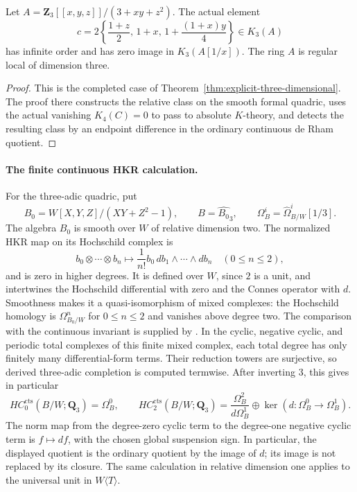 \begin{proposition}
\label{d3:prop:directtcoriginal}
Let $A=\mathbf Z_3[[x,y,z]]/(3+xy+z^2)$. The actual element
\[
 c=2\left\{\frac{1+z}{2},\,1+x,\,
                        1+\frac{(1+x)y}{4}\right\}\in K_3(A)
\]
has infinite order and has zero image in $K_3(A[1/x])$.
The ring $A$ is regular local of dimension three.
\end{proposition}
\begin{proof}
This is the completed case of Theorem~\ref{thm:explicit-three-dimensional}.
The proof there constructs the relative class on the smooth formal quadric,
uses the actual vanishing $K_4(C)=0$ to pass to absolute $K$-theory,
and detects the resulting class by an endpoint difference in the ordinary
continuous de Rham quotient.
\end{proof}

\paragraph{The finite continuous HKR calculation.}
For the three-adic quadric, put
\[
 B_0=W[X,Y,Z]/(XY+Z^2-1),\qquad B=\widehat{B_0}_3,
 \qquad \Omega_B^i=\widehat\Omega^i_{B/W}[1/3].
\]
The algebra $B_0$ is smooth over $W$ of relative dimension two.
The normalized HKR map on its Hochschild complex is
\[
 b_0\otimes\cdots\otimes b_n\longmapsto
 \frac{1}{n!}b_0\,db_1\wedge\cdots\wedge db_n
 \quad(0\le n\le2),
\]
and is zero in higher degrees.  It is defined over $W$, since $2$ is
a unit, and intertwines the Hochschild differential with zero and the
Connes operator with $d$.  Smoothness makes it a quasi-isomorphism of
mixed complexes: the Hochschild homology is $\Omega^n_{B_0/W}$ for
$0\le n\le2$ and vanishes above degree two.
The comparison with the continuous invariant is supplied by
\cite[Proposition~4.2]{AMMN}.  In the cyclic, negative cyclic, and
periodic total complexes of this finite mixed complex, each total
degree has only finitely many differential-form terms.  Their
reduction towers are surjective, so derived three-adic completion is
computed termwise.  After inverting $3$, this gives in particular
\[
 HC^{\mathrm{cts}}_0(B/W;\mathbf Q_3)=\Omega_B^0,
 \qquad
 HC^{\mathrm{cts}}_2(B/W;\mathbf Q_3)
   =\frac{\Omega_B^2}{d\Omega_B^1}
     \oplus\ker(d:\Omega_B^0\to\Omega_B^1).
\]
The norm map from the degree-zero cyclic term to the degree-one
negative cyclic term is $f\mapsto df$, with the chosen global
suspension sign.  In particular, the displayed quotient is the
ordinary quotient by the image of $d$; its image is not replaced by
its closure.  The same calculation in relative dimension one applies
to the universal unit in $W\langle T\rangle$.


